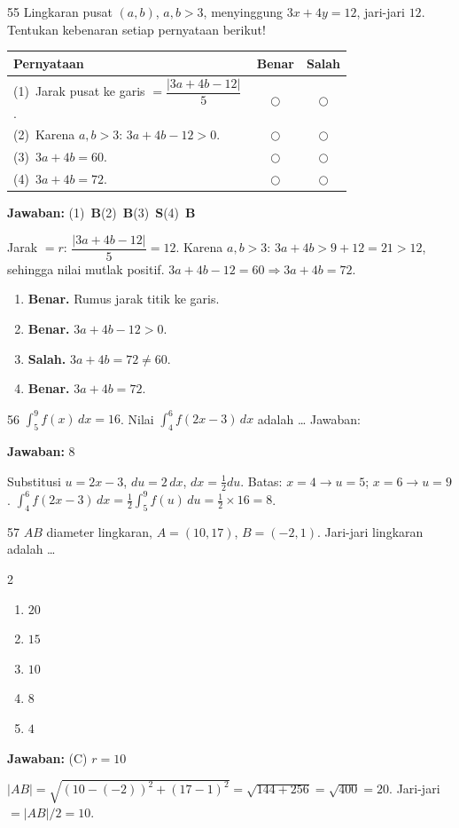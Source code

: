 \documentclass[11pt]{article}
\newcommand{\jawaban}[1]{%
  \noindent\colorbox{gold!30}{\parbox{\dimexpr\linewidth-2\fboxsep\relax}{%
    \textbf{Jawaban:} #1}}\par\smallskip}
\newenvironment{pilB}{%
  \par\smallskip\begin{multicols}{2}
  \begin{enumerate}[label=(\Alph*),leftmargin=*,itemsep=1pt,topsep=3pt]}%
  {\end{enumerate}\end{multicols}}
\begin{document}
\begin{soal}{55}
Lingkaran pusat $(a,b)$, $a,b>3$, menyinggung $3x+4y=12$, jari-jari $12$.
Tentukan kebenaran setiap pernyataan berikut!

\par\smallskip
{\renewcommand{\arraystretch}{1.4}%
\begin{tabular}{@{}p{0.76\linewidth}cc@{}}
\hline\textbf{Pernyataan}&\textbf{Benar}&\textbf{Salah}\\\hline
(1)~Jarak pusat ke garis $=\dfrac{|3a+4b-12|}{5}$.&$\bigcirc$&$\bigcirc$\\
(2)~Karena $a,b>3$: $3a+4b-12>0$.&$\bigcirc$&$\bigcirc$\\
(3)~$3a+4b=60$.&$\bigcirc$&$\bigcirc$\\
(4)~$3a+4b=72$.&$\bigcirc$&$\bigcirc$\\\hline
\end{tabular}}
\end{soal}
\begin{pembox}
\jawaban{(1)~\textbf{B}\quad(2)~\textbf{B}\quad(3)~\textbf{S}\quad(4)~\textbf{B}}
Jarak $=r$: $\dfrac{|3a+4b-12|}{5}=12$. Karena $a,b>3$: $3a+4b>9+12=21>12$, sehingga nilai mutlak positif.
$3a+4b-12=60\Rightarrow3a+4b=72$.
\begin{enumerate}[leftmargin=*,topsep=2pt,itemsep=2pt]
\item \textbf{Benar.} Rumus jarak titik ke garis.
\item \textbf{Benar.} $3a+4b-12>0$.
\item \textbf{Salah.} $3a+4b=72\neq60$.
\item \textbf{Benar.} $3a+4b=72$.
\end{enumerate}
\end{pembox}

\begin{soal}{56}
$\displaystyle\int_5^9 f(x)\,dx=16$. Nilai
$\displaystyle\int_4^6 f(2x-3)\,dx$ adalah \ldots\hfill
Jawaban:\enspace\underline{\hspace{3cm}}
\end{soal}
\begin{pembox}
\jawaban{$8$}
Substitusi $u=2x-3$, $du=2\,dx$, $dx=\tfrac12du$.
Batas: $x=4\to u=5$; $x=6\to u=9$.
$\displaystyle\int_4^6 f(2x-3)\,dx=\tfrac12\int_5^9 f(u)\,du=\tfrac12\times16=8$.
\end{pembox}

\begin{soal}{57}
$AB$ diameter lingkaran, $A=(10,17)$, $B=(-2,1)$. Jari-jari lingkaran adalah \ldots
\begin{pilB}\item $20$\item $15$\item $10$\item $8$\item $4$\end{pilB}
\end{soal}
\begin{pembox}
\jawaban{(C) $r=10$}
$|AB|=\sqrt{(10-(-2))^2+(17-1)^2}=\sqrt{144+256}=\sqrt{400}=20$.
Jari-jari $=|AB|/2=10$.
\end{pembox}
\end{document}
